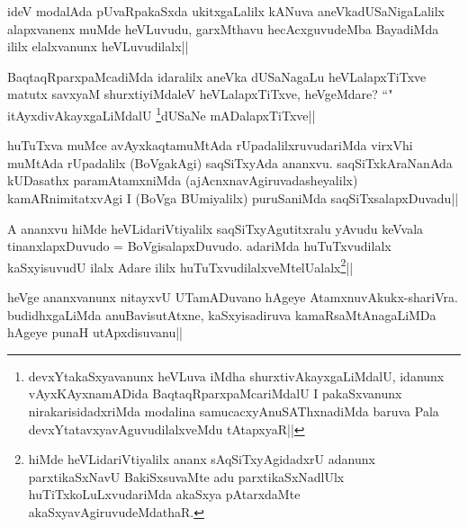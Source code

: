\begin{artha}
ideV modalAda pUvaRpakaSxda ukitxgaLalilx kANuva aneVkadUSaNigaLalilx alapxvanenx muMde heVLuvudu, garxMthavu hecAcxguvudeMba BayadiMda ililx elalxvanunx heVLuvudilalx||
\end{artha}


\begin{artha}
BaqtaqRparxpaMcadiMda idaralilx aneVka dUSaNagaLu heVLalapxTiTxve matutx savxyaM 
shurxtiyiMdaleV heVLalapxTiTxve, heVgeMdare? ``\stext" itAyxdivAkayxgaLiMdalU \footnote[1]{devxYtakaSxyavanunx heVLuva iMdha shurxtivAkayxgaLiMdalU, idanunx vAyxKAyxnamADida BaqtaqRparxpaMcariMdalU I pakaSxvanunx nirakarisidadxriMda modalina samucacxyAnuSAThxnadiMda baruva Pala  devxYtatavxyavAguvudilalxveMdu tAtapxyaR||}dUSaNe 
mADalapxTiTxve||
\end{artha}


\begin{artha}
huTuTxva muMce avAyxkaqtamuMtAda rUpadalilxruvudariMda virxVhi muMtAda rUpadalilx (BoVgakAgi) saqSiTxyAda ananxvu. saqSiTxkAraNanAda kUDasathx paramAtamxniMda (ajAcnxnavAgiruvadasheyalilx) kamARnimitatxvAgi I (BoVga BUmiyalilx) puruSaniMda saqSiTxsalapxDuvadu||
\end{artha}


\begin{artha}
A ananxvu hiMde heVLidariVtiyalilx saqSiTxyAgutitxralu yAvudu keVvala tinanxlapxDuvudo = BoVgisalapxDuvudo. adariMda huTuTxvudilalx kaSxyisuvudU ilalx Adare ililx huTuTxvudilalxveMtelUalalx\footnote[1]{hiMde heVLidariVtiyalilx ananx sAqSiTxyAgidadxrU adanunx parxtikaSxNavU BakiSxsuvaMte adu parxtikaSxNadlUlx huTiTxkoLuLxvudariMda akaSxya pAtarxdaMte akaSxyavAgiruvudeMdathaR.}||
\end{artha}


\begin{artha}
heVge ananxvanunx nitayxvU UTamADuvano hAgeye AtamxnuvAkukx-shariVra. budidhxgaLiMda 
anuBavisutAtxne, kaSxyisadiruva kamaRsaMtAnagaLiMDa hAgeye punaH utApxdisuvanu||
\end{artha}


